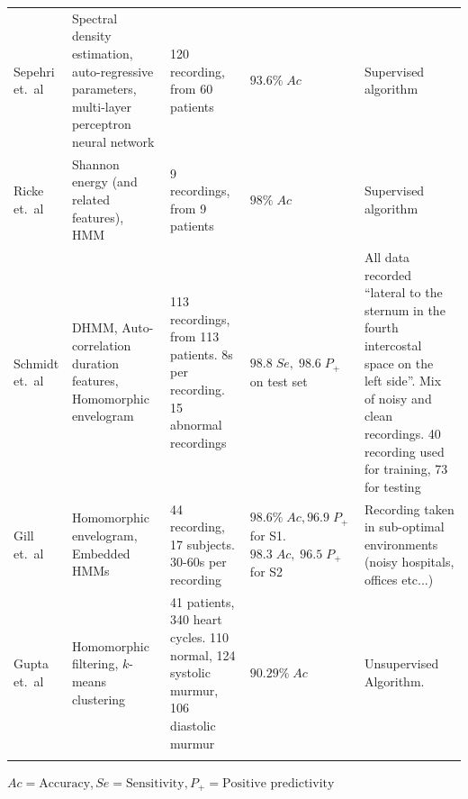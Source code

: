 \documentclass[titlepage, 12pt]{scrartcl} \usepackage{enumitem}
\newcommand{\dbottomrule}{\specialrule{1pt}{0pt}{1.4pt}%
            \specialrule{1pt}{0pt}{\belowrulesep}%
            }
\begin{document}
\begin{landscape}
\begin{table}[htbp]
\begin{tabulary}{\linewidth}{LLLLL}
Sepehri et.\ al \citeyearpar{Sepehri2010}        & Spectral density estimation, auto-regressive parameters, multi-layer perceptron neural network & 120 recording, from 60 patients                                                       & $93.6\%\;Ac$                                           & Supervised algorithm                                                                                                                                                             \\
Ricke et.\ al \citeyearpar{Ricke2005}    & Shannon energy (and related features), HMM                                                     & 9 recordings, from 9 patients                                                         & $98\%\;Ac$                                             & Supervised algorithm                                                                                                                                                             \\
Schmidt et.\ al \citeyearpar{Schmidt2015}  & DHMM, Auto-correlation duration features, Homomorphic envelogram                               & 113 recordings, from 113 patients. 8s per recording. 15 abnormal recordings           & $98.8\;Se,\;98.6\;P_+$ on test set                         & All data recorded ``lateral to the sternum in the fourth intercostal space on the left side''. Mix of noisy and clean recordings. 40 recording used for training, 73 for testing \\
Gill et.\ al \citeyearpar{Gill2005}         & Homomorphic envelogram, Embedded HMMs                                                          & 44 recording, 17 subjects. 30-60s per recording                                       & $98.6\%\;Ac, 96.9\;P_+$ for S1. $98.3\;Ac,\;96.5\;P_+$ for S2 & Recording taken in sub-optimal environments (noisy hospitals, offices etc...)                                                                                                    \\
Gupta et.\ al \citeyearpar{Gupta2007}    & Homomorphic filtering, $k$-means clustering                                                       & 41 patients, 340 heart cycles. 110 normal,  124 systolic murmur, 106 diastolic murmur & $90.29\%\;Ac$                                          & Unsupervised Algorithm.                                                                                                                                                          \\ \hline
\dbottomrule\\
\end{tabulary}
$Ac = \text{Accuracy}, Se = \text{Sensitivity}, P_+ = \text{Positive predictivity}$
\end{table}
\end{landscape}
\restoregeometry
\end{document}
